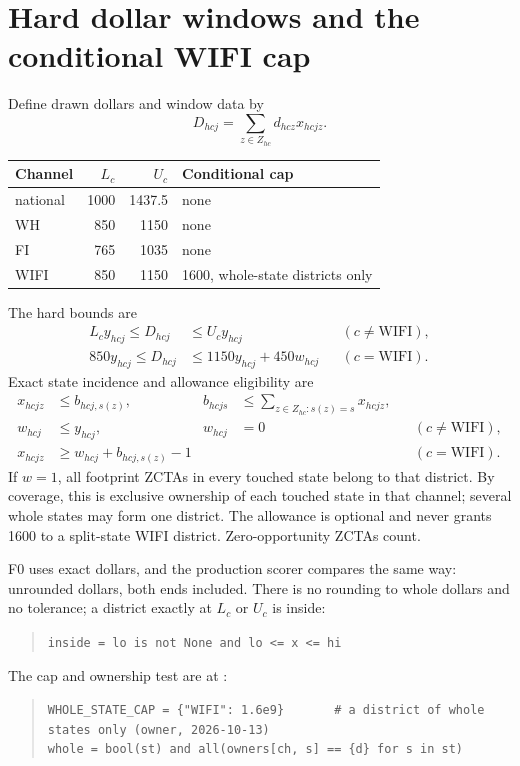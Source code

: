 \documentclass[11pt,letterpaper]{article}
\begin{document}
\section{Hard dollar windows and the conditional WIFI cap}
Define drawn dollars and window data by
\begin{equation}\label{eq:dollars}
 D_{hcj}=\sum_{z\in Z_{hc}}d_{hcz}x_{hcjz}.
\end{equation}
\begin{center}
\begin{tabular}{lrrl}
\hline
Channel & $L_c$ & $U_c$ & Conditional cap\\ \hline
national & 1000 & 1437.5 & none\\
WH & 850 & 1150 & none\\
FI & 765 & 1035 & none\\
WIFI & 850 & 1150 & 1600, whole-state districts only\\ \hline
\end{tabular}
\end{center}
The hard bounds are
\begin{equation}\label{eq:windows}
\begin{aligned}
 L_cy_{hcj}\le D_{hcj}&\le U_cy_{hcj} &&(c\ne\mathrm{WIFI}),\\
 850y_{hcj}\le D_{hcj}&\le1150y_{hcj}+450w_{hcj} &&(c=\mathrm{WIFI}).
\end{aligned}
\end{equation}
Exact state incidence and allowance eligibility are
\begin{equation}\label{eq:whole}
\begin{aligned}
 x_{hcjz}&\le b_{hcj,s(z)},&
 b_{hcjs}&\le\sum_{z\in Z_{hc}:s(z)=s}x_{hcjz},\\
 w_{hcj}&\le y_{hcj},& w_{hcj}&=0 &&(c\ne\mathrm{WIFI}),\\
 x_{hcjz}&\ge w_{hcj}+b_{hcj,s(z)}-1 &&&&(c=\mathrm{WIFI}).
\end{aligned}
\end{equation}
If $w=1$, all footprint ZCTAs in every touched state belong to that district.
By coverage, this is exclusive ownership of each touched state in that channel;
several whole states may form one district. The allowance is optional and
never grants 1600 to a split-state WIFI district. Zero-opportunity ZCTAs count.

F0 uses exact dollars, and the production scorer compares the same way: unrounded
dollars, both ends included. There is no rounding to whole dollars and no
tolerance; a district exactly at $L_c$ or $U_c$ is inside:
\begin{quote}\small
\verb|inside = lo is not None and lo <= x <= hi|
\end{quote}
The cap and ownership test are at :
\begin{quote}\fontsize{7}{9}\selectfont
\verb|WHOLE_STATE_CAP = {"WIFI": 1.6e9}       # a district of whole states only (owner, 2026-10-13)|\\
\verb|whole = bool(st) and all(owners[ch, s] == {d} for s in st)|
\end{quote}
\end{document}
